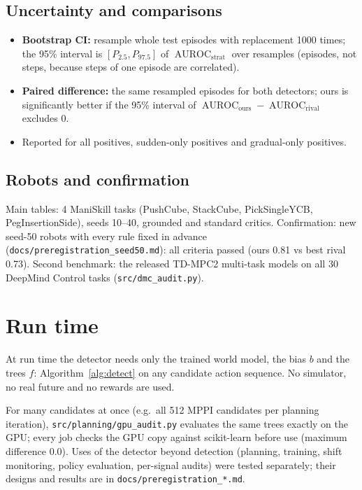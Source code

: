 \documentclass[11pt]{article}
\newcommand{\code}[1]{\texttt{#1}}
\begin{document}
\subsection{Uncertainty and comparisons}

\begin{itemize}[nosep]
\item \textbf{Bootstrap CI:} resample whole test episodes with replacement 1000 times; the 95\% interval is
$[P_{2.5},P_{97.5}]$ of $\operatorname{AUROC}_{\text{strat}}$ over resamples (episodes, not steps, because steps of one
episode are correlated).
\item \textbf{Paired difference:} the same resampled episodes for both detectors; ours is significantly better
if the 95\% interval of $\operatorname{AUROC}_{\text{ours}}-\operatorname{AUROC}_{\text{rival}}$ excludes 0.
\item Reported for all positives, sudden-only positives and gradual-only positives.
\end{itemize}

\subsection{Robots and confirmation}

Main tables: 4 ManiSkill tasks (PushCube, StackCube, PickSingleYCB, PegInsertionSide), seeds 10--40, grounded and
standard critics. Confirmation: new seed-50 robots with every rule fixed in advance
(\code{docs/preregistration\_seed50.md}): all criteria passed (ours 0.81 vs best rival 0.73). Second benchmark: the
released TD-MPC2 multi-task models on all 30 DeepMind Control tasks (\code{src/dmc\_audit.py}).

\section{Run time}\label{sec:runtime}

At run time the detector needs only the trained world model, the bias $b$ and the trees $f$: Algorithm~\ref{alg:detect}
on any candidate action sequence. No simulator, no real future and no rewards are used.

For many candidates at once (e.g.\ all 512 MPPI candidates per planning iteration), \code{src/planning/gpu\_audit.py}
evaluates the same trees exactly on the GPU; every job checks the GPU copy against scikit-learn before use (maximum
difference $0.0$). Uses of the detector beyond detection (planning, training, shift monitoring, policy evaluation,
per-signal audits) were tested separately; their designs and results are in \code{docs/preregistration\_*.md}.
\end{document}
